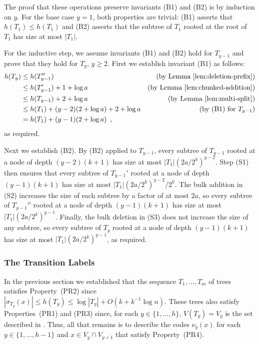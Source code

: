 \documentclass[kpfonts]{patmorin}
\begin{document}
The proof that these operations preserve invariants (B1) and (B2) is by induction on $y$.  For the base case $y=1$, both properties are trivial: (B1) asserts that $h(T_1)\le h(T_1)$ and (B2) asserts that the subtree of $T_1$ rooted at the root of $T_1$ has size at most $|T_1|$.

For the inductive step, we assume invariants (B1) and (B2) hold for $T_{y-1}$ and prove that they hold for $T_{y}$, $y\ge 2$.  First we establish invariant (B1) as follows:
\begin{align*}  
  h(T_y) & \le h(T_{y-1}'') & \text{(by \lemref{deletion-prefix})} \\
          & \le h(T_{y-1}') + 1 + \log a & \text{(by \lemref{chunked-addition})} \\
          & \le h(T_{y-1}) + 2 + \log a & \text{(by \lemref{multi-split})} \\
          & \le h(T_1) + (y-2)(2+\log a) + 2 + \log a & \text{(by (B1) for $T_{y-1}$)}\\
          & = h(T_1) + (y-1)(2+\log a) \enspace ,
\end{align*}
as required.

Next we establish (B2).  By (B2) applied to $T_{y-1}$, every subtree of $T_{y-1}$ rooted at a node of depth $(y-2)(k+1)$ has size at most $|T_{1}|(2a/2^k)^{y-2}$.  Step (S1) then ensures that every subtree of $T_{y-1}'$ rooted at a node of depth $(y-1)(k+1)$ has size at most $|T_{1}|(2a/2^k)^{y-2}/2^k$.  The bulk addition in (S2) increases the size of each subtree by a factor of at most $2a$, so every subtree of $T_{y-1}''$ rooted at a node of depth $(y-1)(k+1)$ has size at most $|T_{1}|(2a/2^k)^{y-1} $.  Finally, the bulk deletion in (S3) does not increase the size of any subtree, so every subtree of $T_{y}$ rooted at a node of depth $(y-1)(k+1)$ has size at most $|T_{1}|(2a/2^k)^{y-1}$, as required.


\subsubsection{The Transition Labels}

In the previous section we established that the sequence $T_1,\ldots,T_m$ of trees satisfies Property~(PR2) since $|\sigma_{T_y}(x)|\le h(T_y)\le \log |T_y|+O(k+k^{-1}\log n)$.  These trees also satisfy Properties~(PR1) and (PR3) since, for each $y\in\{1,\ldots,h\}$, $V(T_y)=V_y$ is the set described in .  Thus, all that remains is to describe the codes $\nu_y(x)$ for each $y\in\{1,\ldots,h-1\}$ and $x\in V_y\cap V_{y+1}$ that satisfy Property~(PR4).
\end{document}
